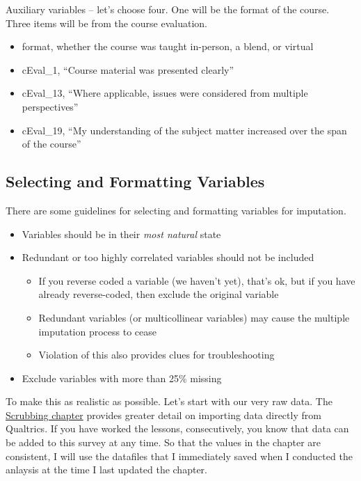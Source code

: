 \documentclass[
  11pt,
]{book}
\providecommand{\tightlist}{%
  \setlength{\itemsep}{0pt}\setlength{\parskip}{0pt}}
\begin{document}
Auxiliary variables -- let's choose four. One will be the format of the course. Three items will be from the course evaluation.

\begin{itemize}
\tightlist
\item
  format, whether the course was taught in-person, a blend, or virtual
\item
  cEval\_1, ``Course material was presented clearly''
\item
  cEval\_13, ``Where applicable, issues were considered from multiple perspectives''
\item
  cEval\_19, ``My understanding of the subject matter increased over the span of the course''
\end{itemize}

\hypertarget{selecting-and-formatting-variables}{%
\subsection{Selecting and Formatting Variables}\label{selecting-and-formatting-variables}}

There are some guidelines for selecting and formatting variables for imputation.

\begin{itemize}
\tightlist
\item
  Variables should be in their \emph{most natural} state
\item
  Redundant or too highly correlated variables should not be included

  \begin{itemize}
  \tightlist
  \item
    If you reverse coded a variable (we haven't yet), that's ok, but if you have already reverse-coded, then exclude the original variable
  \item
    Redundant variables (or multicollinear variables) may cause the multiple imputation process to cease
  \item
    Violation of this also provides clues for troubleshooting
  \end{itemize}
\item
  Exclude variables with more than 25\% missing
\end{itemize}

To make this as realistic as possible. Let's start with our very raw data. The \protect\hyperlink{scrub}{Scrubbing chapter} provides greater detail on importing data directly from Qualtrics. If you have worked the lessons, consecutively, you know that data can be added to this survey at any time. So that the values in the chapter are consistent, I will use the datafiles that I immediately saved when I conducted the anlaysis at the time I last updated the chapter.
\end{document}
